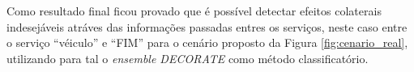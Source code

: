 Como resultado final ficou provado que é possível detectar efeitos colaterais indesejáveis atráves das informações passadas entres os serviços, neste caso entre o serviço ``véiculo'' e ``FIM'' para o cenário proposto da Figura \ref{fig:cenario_real}, utilizando para tal o \textit{ensemble DECORATE} como método classificatório.
